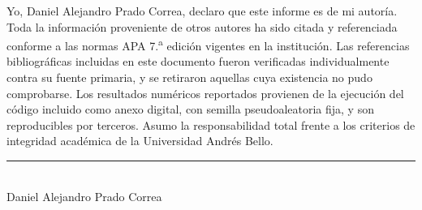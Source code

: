 \documentclass[12pt,letterpaper,oneside]{article}
\begin{document}
Yo, Daniel Alejandro Prado Correa, declaro que este informe es de mi autoría.
Toda la información proveniente de otros autores ha sido citada y referenciada
conforme a las normas APA 7.\textsuperscript{a} edición vigentes en la
institución. Las referencias bibliográficas incluidas en este documento fueron
verificadas individualmente contra su fuente primaria, y se retiraron aquellas
cuya existencia no pudo comprobarse. Los resultados numéricos reportados
provienen de la ejecución del código incluido como anexo digital, con semilla
pseudoaleatoria fija, y son reproducibles por terceros. Asumo la
responsabilidad total frente a los criterios de integridad académica de la
Universidad Andrés Bello.

\vspace{2.2cm}
\begin{center}
\rule{7.5cm}{0.4pt}\\
Daniel Alejandro Prado Correa
\end{center}

\newpage

{\singlespacing
\tableofcontents
\newpage
\listoffigures
\vspace{1.0cm}
\listoftables
}
\newpage





















\newpage
{\singlespacing
\printbibliography[title={Referencias}]
}


\end{document}
